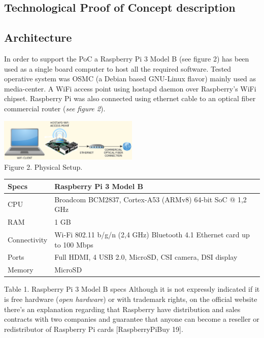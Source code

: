 \documentclass[12pt]{amsart}
\begin{document}
\begin{multicols}{2}
\section{Technological Proof of Concept description}

\subsection{Architecture}
\label{ch:architecture}
\vspace{0.35cm}

In order to support the PoC a
Raspberry Pi 3 Model B (see figure 2) has been used
as a single board computer to host all the required software.
Tested operative system was OSMC\cite{osmc} (a Debian based
GNU-Linux flavor) mainly used as media-center.
A WiFi access point using
hostapd\cite{hostapd} daemon over Raspberry's WiFi chipset.
Raspberry Pi was also connected using ethernet cable
to an optical fiber commercial router (\textit{see figure 2}).

\begin{center}
  \includegraphics[keepaspectratio, width=0.5\textwidth]{images/physical-setup-y.eps}
\\
Figure 2. Physical Setup.
\\

\vspace{0.35cm}

\begin{tabular}{ | m{} | m{} | }
 \hline
 Specs & Raspberry Pi 3 Model B \\
 \hline
 CPU & Broadcom BCM2837, Cortex-A53 (ARMv8) 64-bit SoC @ 1,2 GHz \\
\hline
 RAM & 1 GB \\
\hline
 Connectivity & Wi-Fi 802.11 b/g/n (2,4 GHz) Bluetooth 4.1 Ethernet card up to 100 Mbps \\
\hline
 Ports & Full HDMI, 4 USB 2.0, MicroSD, CSI camera, DSI display \\
\hline
 Memory & MicroSD \\
\hline
\end{tabular}
\end{center}
\vspace{0.15cm}
Table 1. Raspberry Pi 3 Model B specs
Although it is not expressly indicated if it is free hardware
(\textit{open hardware}) or with trademark rights, on the
official website there's an explanation regarding
that Raspberry have distribution and sales contracts with
two companies and guarantee that anyone can become a reseller or
redistributor of Raspberry Pi cards [RaspberryPiBuy 19].




\end{multicols}
\end{document}
